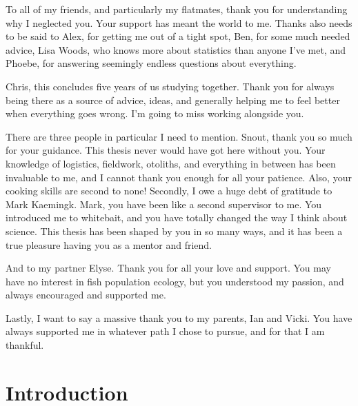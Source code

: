 \documentclass[]{book}
\begin{document}
To all of my friends, and particularly my flatmates, thank you for
understanding why I neglected you. Your support has meant the world to
me. Thanks also needs to be said to Alex, for getting me out of a tight
spot, Ben, for some much needed advice, Lisa Woods, who knows more about
statistics than anyone I've met, and Phoebe, for answering seemingly
endless questions about everything.

Chris, this concludes five years of us studying together. Thank you for
always being there as a source of advice, ideas, and generally helping
me to feel better when everything goes wrong. I'm going to miss working
alongside you.

There are three people in particular I need to mention. Snout, thank you
so much for your guidance. This thesis never would have got here without
you. Your knowledge of logistics, fieldwork, otoliths, and everything in
between has been invaluable to me, and I cannot thank you enough for all
your patience. Also, your cooking skills are second to none! Secondly, I
owe a huge debt of gratitude to Mark Kaemingk. Mark, you have been like
a second supervisor to me. You introduced me to whitebait, and you have
totally changed the way I think about science. This thesis has been
shaped by you in so many ways, and it has been a true pleasure having
you as a mentor and friend.

And to my partner Elyse. Thank you for all your love and support. You
may have no interest in fish population ecology, but you understood my
passion, and always encouraged and supported me.

Lastly, I want to say a massive thank you to my parents, Ian and Vicki.
You have always supported me in whatever path I chose to pursue, and for
that I am thankful.

\chapter{Introduction}\label{introduction}
\end{document}
